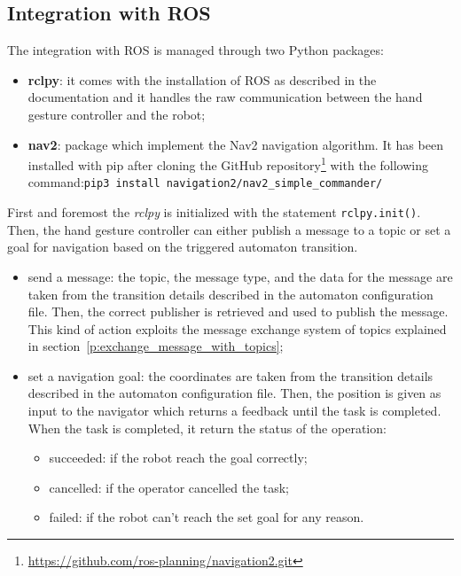 \documentclass[../thesis.tex]{subfiles}
\begin{document}
\subsection{Integration with ROS}
The integration with \acrshort{ROS} is managed through two Python packages:
\begin{itemize}
    \item \textbf{rclpy}: it comes with the installation of \acrshort{ROS} as described in the documentation and it handles the raw communication between the hand gesture controller and the robot;
    \item \textbf{nav2}: package which implement the Nav2 navigation algorithm. It has been installed with pip after cloning the GitHub repository\footnote{\href{https://github.com/ros-planning/navigation2.git}{https://github.com/ros-planning/navigation2.git}} with the following command:\newline\texttt{pip3 install navigation2/nav2\_simple\_commander/}
\end{itemize}
First and foremost the \textit{rclpy} is initialized with the statement \texttt{rclpy.init()}. Then, the hand gesture controller can either publish a message to a topic or set a goal for navigation based on the triggered automaton transition.
\begin{itemize}
    \item send a message: the topic, the message type, and the data for the message are taken from the transition details described in the automaton configuration file. Then, the correct publisher is retrieved and used to publish the message. This kind of action exploits the message exchange system of topics explained in section~\ref{p:exchange_message_with_topics};
    \item set a navigation goal: the coordinates are taken from the transition details described in the automaton configuration file. Then, the position is given as input to the navigator which returns a feedback until the task is completed. When the task is completed, it return the status of the operation:
    \begin{itemize}
        \item succeeded: if the robot reach the goal correctly;
        \item cancelled: if the operator cancelled the task;
        \item failed: if the robot can't reach the set goal for any reason.
    \end{itemize}
\end{itemize}
\end{document}

